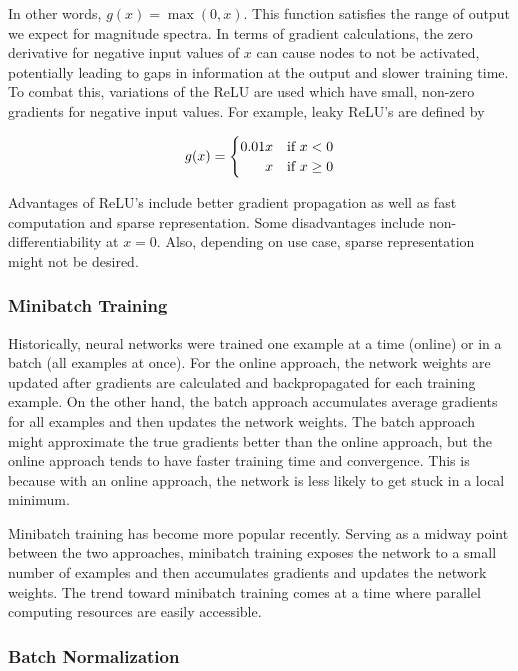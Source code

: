 In other words, $g(x)=\max{(0,x)}$. This function satisfies the range of output we expect for magnitude spectra. In terms of gradient calculations, the zero derivative for negative input values of $x$ can cause nodes to not be activated, potentially leading to gaps in information at the output and slower training time. To combat this, variations of the ReLU are used which have small, non-zero gradients for negative input values. For example, leaky ReLU's are defined by

\begin{equation}
g(x) =
    \begin{cases}
        \hfill 0.01x & \text{if $x < 0$}\\
        \hfill x & \text{if $x \ge 0$}
    \end{cases}
\end{equation}

Advantages of ReLU's include better gradient propagation as well as fast computation and sparse representation. Some disadvantages include non-differentiability at $x=0$. Also, depending on use case, sparse representation might not be desired.

\subsubsection{Minibatch Training}

Historically, neural networks were trained one example at a time (online) or in a batch (all examples at once). \cite{wilson2003general} For the online approach, the network weights are updated after gradients are calculated and backpropagated for each training example. On the other hand, the batch approach accumulates average gradients for all examples and then updates the network weights. The batch approach might approximate the true gradients better than the online approach, but the online approach tends to have faster training time and convergence. \cite{wilson2003general} This is because with an online approach, the network is less likely to get stuck in a local minimum.

Minibatch training has become more popular recently. Serving as a midway point between the two approaches, minibatch training exposes the network to a small number of examples and then accumulates gradients and updates the network weights. The trend toward minibatch training comes at a time where parallel computing resources are easily accessible.


\subsubsection{Batch Normalization}

